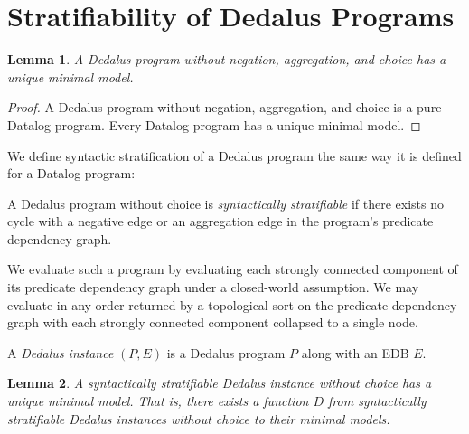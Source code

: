 
\section{Stratifiability of Dedalus Programs}

\newtheorem{lemma}{Lemma} 

\begin{lemma} 
%
A Dedalus program without negation, aggregation, and choice has a unique
minimal model.
%
\end{lemma}

\begin{proof} 
%
A Dedalus program without negation, aggregation, and choice is a pure Datalog
program.  Every Datalog program has a unique minimal model. 
%
\end{proof}



We define syntactic stratification of a Dedalus program the same way it is
defined for a Datalog program:

\begin{definition}
%
A Dedalus program without choice is \emph{syntactically stratifiable} if there
exists no cycle with a negative edge or an aggregation edge in the program's
predicate dependency graph.
%
\end{definition}

We evaluate such a program by evaluating each strongly connected component of
its predicate dependency graph under a closed-world assumption.  We may
evaluate in any order returned by a topological sort on the predicate
dependency graph with each strongly connected component collapsed to a single
node. 

\begin{definition}
%
A {\em Dedalus instance} $(P,E)$ is a Dedalus program $P$ along with an EDB
$E$.
%
\end{definition}

\begin{lemma}
%
A syntactically stratifiable Dedalus instance without choice has a unique
minimal model.  That is, there exists a function $D$ from syntactically
stratifiable Dedalus instances without choice to their minimal models.
%
\end{lemma}

